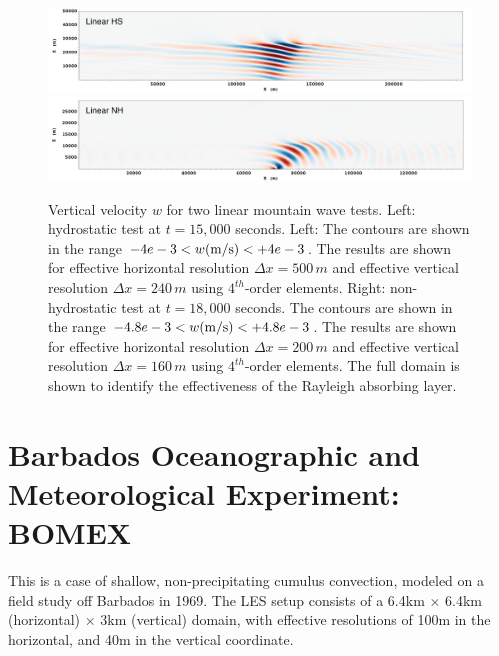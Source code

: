 \documentclass{report}
\begin{document}
\begin{figure}
    \centering
    \includegraphics[width=\textwidth]{./figures/benchmarks/mountain_waves/LHS-color-full-domain-500mx240m-notes.png}
    \includegraphics[width=\textwidth]{./figures/benchmarks/mountain_waves/LNH-color-full-domain-200mx160m-notes.png}
     \caption{Vertical velocity $w$ for two linear mountain wave tests. Left:  hydrostatic test at $t=15,000$ seconds. 
     Left: The contours are shown in the range $-4e-3 < w ({\rm m/s})< +4e-3$. The results are shown for effective horizontal resolution $\Delta x=500\,{m}$ and effective vertical resolution $\Delta x=240\,{m}$ using $4^{th}$-order elements.
     Right: non-hydrostatic test at $t=18,000$ seconds. The contours are shown in the range $-4.8e-3 < w ({\rm m/s}) < +4.8e-3$. The results are shown for effective horizontal resolution $\Delta x=200\,{m}$ and effective vertical resolution $\Delta x=160\,{m}$ using $4^{th}$-order elements. The full domain is shown to identify the effectiveness of the Rayleigh absorbing layer.}
\label{fig:mountainWaves}
\end{figure}




\section{Barbados Oceanographic and Meteorological Experiment: BOMEX}

This is a case of shallow, non-precipitating cumulus convection, modeled on a field study off Barbados in 1969. The LES setup consists of a 6.4km $\times$ 6.4km (horizontal) $\times$ 3km (vertical) domain, with effective resolutions of 100m in the horizontal, and 40m in the vertical coordinate. 
\end{document}

